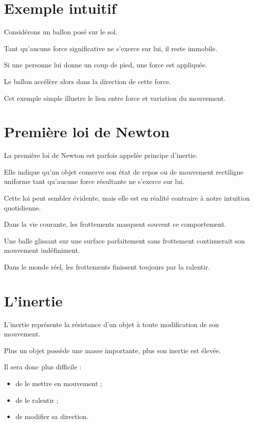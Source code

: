 \section{Exemple intuitif}

Considérons un ballon posé sur le sol.

Tant qu'aucune force significative ne s'exerce sur lui, il reste immobile.

Si une personne lui donne un coup de pied, une force est appliquée.

Le ballon accélère alors dans la direction de cette force.

Cet exemple simple illustre le lien entre force et variation du mouvement.

\section{Première loi de Newton}

La première loi de Newton est parfois appelée principe d'inertie.

Elle indique qu'un objet conserve son état de repos ou de mouvement rectiligne
uniforme tant qu'aucune force résultante ne s'exerce sur lui.

Cette loi peut sembler évidente, mais elle est en réalité contraire à notre
intuition quotidienne.

Dans la vie courante, les frottements masquent souvent ce comportement.

\begin{exemple}

Une balle glissant sur une surface parfaitement sans frottement continuerait
son mouvement indéfiniment.

Dans le monde réel, les frottements finissent toujours par la ralentir.

\end{exemple}

\section{L'inertie}

L'inertie représente la résistance d'un objet à toute modification de son
mouvement.

Plus un objet possède une masse importante, plus son inertie est élevée.

Il sera donc plus difficile :

\begin{itemize}
\item de le mettre en mouvement ;
\item de le ralentir ;
\item de modifier sa direction.
\end{itemize}

